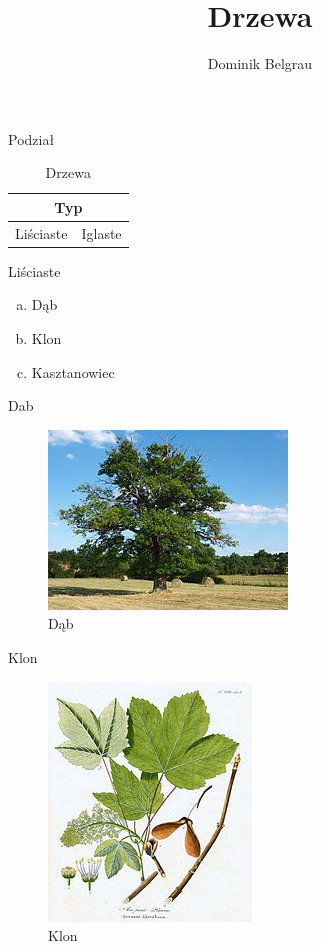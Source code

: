 \documentclass{beamer}
\title{Drzewa}
\author{Dominik Belgrau}
\begin{document}
\begin{frame}
\titlepage
\end{frame}

\begin{frame}{Podział}
\begin{table}
\begin{center}
\begin{tabular}{ |p{3cm}|p{3cm}| }
 \hline
 \multicolumn{2}{|c|}{Typ} \\
 \hline
 Liściaste &Iglaste\\
\hline
\end{tabular}
\caption{Drzewa}
\label{t1}
\end{center}
\end{table}
\end{frame}

\begin{frame}{Liściaste}
\begin{enumerate}[a)]
\item Dąb
\pause
\item Klon
\pause
\item Kasztanowiec
\end{enumerate}
\end{frame}

\begin{frame}{Dab}
\begin{figure}[h!]
\includegraphics[scale=13]{dab.jpg}
\caption{Dąb \cite{Wiki}}
\label{dab}
\end{figure}
\end{frame}

\begin{frame}{Klon}
\begin{figure}[h!]
\includegraphics[scale=2]{klon.jpg}
\caption{Klon \cite{Wiki}}
\label{klo}
\end{figure}
\end{frame}
\end{document}
